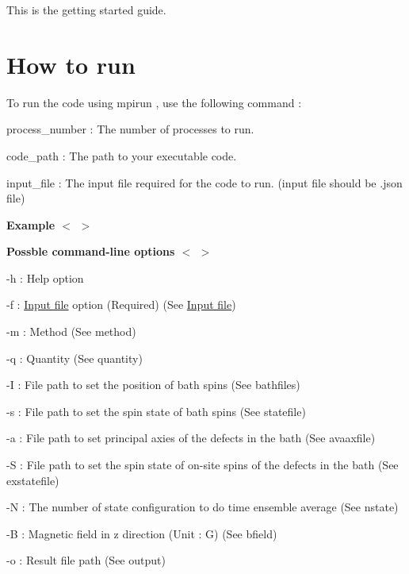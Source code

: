 This is the getting started guide.\hypertarget{GettingStarted_HowToRun}{}\section{How to run}\label{GettingStarted_HowToRun}
To run the code using {\ttfamily  mpirun }, use the following command \-:





\begin{DoxyItemize}
\item process\-\_\-number \-: The number of processes to run.
\item code\-\_\-path \-: The path to your executable code.
\item input\-\_\-file \-: The input file required for the code to run. (input file should be {\ttfamily .json} file)
\end{DoxyItemize}

{\bfseries  Example $<${\bfseries } $>$}

{\bfseries 
{}
}

{\bfseries {\bfseries  Possble command-\/line options $<${\bfseries } $>$
\begin{DoxyItemize}
\item -\/h \-: Help option
\item -\/f \-: \hyperlink{InputFile}{Input file} option (Required) (See \hyperlink{InputFile}{Input file})
\item -\/m \-: Method (See method)
\item -\/q \-: Quantity (See quantity)
\item -\/\-I \-: File path to set the position of bath spins (See bathfiles)
\item -\/s \-: File path to set the spin state of bath spins (See statefile)
\item -\/a \-: File path to set principal axies of the defects in the bath (See avaaxfile)
\item -\/\-S \-: File path to set the spin state of on-\/site spins of the defects in the bath (See exstatefile) 
\item -\/\-N \-: The number of state configuration to do time ensemble average (See nstate)
\item -\/\-B \-: Magnetic field in z direction (Unit \-: G) (See bfield)
\item -\/o \-: Result file path (See output)
\end{DoxyItemize}}}

